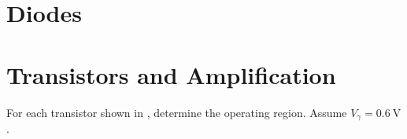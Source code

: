 \documentclass[10pt,a4paper]{memoir}
\begin{document}
\chapter{Diodes}

\chapter{Transistors and Amplification}

\begin{question}
  For each transistor shown in , determine the operating region. Assume $V_{\gamma}=\SI{0.6}{\volt}$.
  \begin{figure}[!h]
    \centering
    \subfloat[]{\texttt{[image: t10-1a]}} \qquad\qquad
    \subfloat[]{\texttt{[image: t10-1b]}} \qquad\qquad
    \subfloat[]{\texttt{[image: t10-1c]}}
    \caption{}
    \label{fig:t10-1}
  \end{figure}
\end{question}
\end{document}
